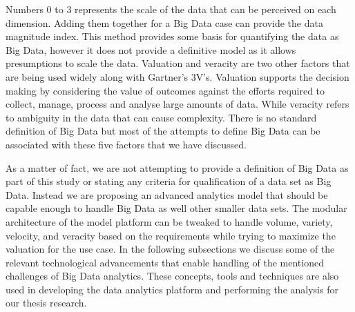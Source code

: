 Numbers 0 to 3 represents the scale of the data that can be perceived on each dimension. Adding them together for a Big Data case can provide the data magnitude index. This method provides some basis for quantifying the data as Big Data, however it does not provide a definitive model as it allows presumptions to scale the data. Valuation and veracity are two other factors that are being used widely along with Gartner's 3V's. Valuation supports the decision making by considering the value of outcomes against the efforts required to collect, manage, process and analyse large amounts of data.  While veracity refers to ambiguity in the data that can cause complexity. There is no standard definition of Big Data but most of the attempts to define Big Data can be associated with these five factors that we have discussed.

As a matter of fact, we are not attempting to provide a definition of Big Data as part of this study or stating any criteria for qualification of a data set as Big Data. Instead we are proposing an advanced analytics model that should be capable enough to handle Big Data as well other smaller data sets. The modular architecture of the model platform can be tweaked to handle volume, variety, velocity, and veracity based on the requirements while trying to maximize the valuation for the use case. In the following subsections we discuss some of the relevant technological advancements that enable handling of the mentioned challenges of Big Data analytics. These concepts, tools and techniques are also used in developing the data analytics platform and performing the analysis for our thesis research.

